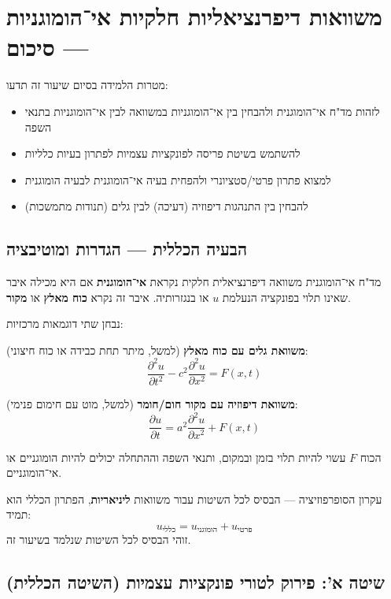 \section{משוואות דיפרנציאליות חלקיות אי־הומוגניות — סיכום }

\begin{summarybox}{מטרות הלמידה}
בסיום שיעור זה תדעו:
\begin{itemize}
    \item לזהות מד"ח אי־הומוגנית ולהבחין בין אי־הומוגניות במשוואה לבין אי־הומוגניות בתנאי השפה
    \item להשתמש בשיטת פריסה לפונקציות עצמיות לפתרון בעיות כלליות
    \item למצוא פתרון פרטי/סטציונרי ולהפחית בעיה אי־הומוגנית לבעיה הומוגנית
    \item להבחין בין התנהגות דיפוזיה (דעיכה) לבין גלים (תנודות מתמשכות)
\end{itemize}
\end{summarybox}

\subsection{הבעיה הכללית — הגדרות ומוטיבציה}

\begin{definitionbox}{מד"ח אי־הומוגנית}
משוואה דיפרנציאלית חלקית נקראת \textbf{אי־הומוגנית} אם היא מכילה איבר שאינו תלוי בפונקציה הנעלמת $u$ או בנגזרותיה. איבר זה נקרא \textbf{כוח מאלץ} או \textbf{מקור}.
\end{definitionbox}

נבחן שתי דוגמאות מרכזיות:

\textbf{משוואת גלים עם כוח מאלץ} (למשל, מיתר תחת כבידה או כוח חיצוני):
\[
\boxed{\frac{\partial^2 u}{\partial t^2}-c^2\frac{\partial^2 u}{\partial x^2}=F(x,t)}
\]

\textbf{משוואת דיפוזיה עם מקור חום/חומר} (למשל, מוט עם חימום פנימי):
\[
\boxed{\frac{\partial u}{\partial t}=a^2\frac{\partial^2 u}{\partial x^2}+F(x,t)}
\]

הכוח $F$ עשוי להיות תלוי בזמן ובמקום, ותנאי השפה וההתחלה יכולים להיות הומוגניים או אי־הומוגניים.

\begin{notebox}{עקרון הסופרפוזיציה — הבסיס לכל השיטות}
עבור משוואות \textbf{ליניאריות}, הפתרון הכללי הוא תמיד:
\[
u_{\text{כללי}} = u_{\text{הומוגני}} + u_{\text{פרטי}}
\]
זוהי הבסיס לכל השיטות שנלמד בשיעור זה.
\end{notebox}

\subsection{שיטה א': פירוק לטורי פונקציות עצמיות (השיטה הכללית)}

